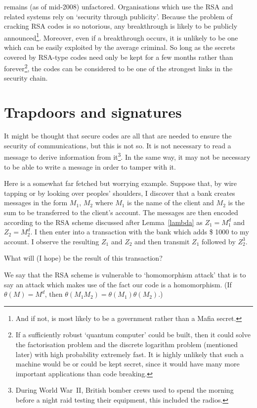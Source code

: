 remains (as of mid-2008) unfactored.
Organisations which use the RSA and related systems
rely on `security through publicity'. Because
the problem of cracking RSA codes is so notorious,
any breakthrough is likely to be publicly
announced\footnote{And if not, is most likely
to be a government rather than a Mafia secret.}.
Moreover, even if a breakthrough occurs, it
is unlikely to be one which can be easily
exploited by the average criminal. So long
as the secrets covered by RSA-type codes
need only be kept for a few months rather
than forever\footnote{If a sufficiently robust
`quantum computer' could be built, then
it could solve the factorisation problem
and the discrete logarithm problem
(mentioned later) with high probability
extremely fast. It is highly unlikely
that such a machine would be or could be
kept secret, since it would have many more
important applications than
code breaking.}, the codes can be considered
to be one of the strongest links in the
security chain.
\section{Trapdoors and signatures}\label{trapdoors}
It might be thought that secure codes
are all that are needed to ensure
the security of communications,
but this is not so. It is not necessary
to read a message to derive information
from it\footnote{During World War~II,
British bomber crews used to spend the morning
before a night raid testing their equipment,
this included the radios.}. In the same way,
it may not be necessary to be able to
write a message in order to tamper with it.

Here is a somewhat far fetched but worrying example.
Suppose that, by wire tapping or by looking over
peoples' shoulders, I discover that a bank
creates messages in the form $M_{1}$, $M_{2}$
where $M_{1}$ is the name of the client
and $M_{2}$ is the sum to be transferred
to the client's account.
The messages are then encoded
according to the RSA scheme discussed after Lemma~\ref{lambda}
as $Z_{1}=M_{1}^{d}$ and $Z_{2}=M_{2}^{d}$. I then
enter into a transaction with the bank
which adds \$ 1000  to my account.
I observe the resulting $Z_{1}$ and $Z_{2}$
and then transmit $Z_{1}$ followed by $Z_{2}^{3}$.
\begin{example} What will (I hope) be the result
of this transaction?
\end{example}
\noindent
We say that the RSA scheme is vulnerable to
`homomorphism attack' that is to say an attack
which makes use of the fact our code is a homomorphism.
(If $\theta(M)=M^{d}$, then 
$\theta(M_{1}M_{2})=\theta(M_{1})\theta(M_{2})$.)


